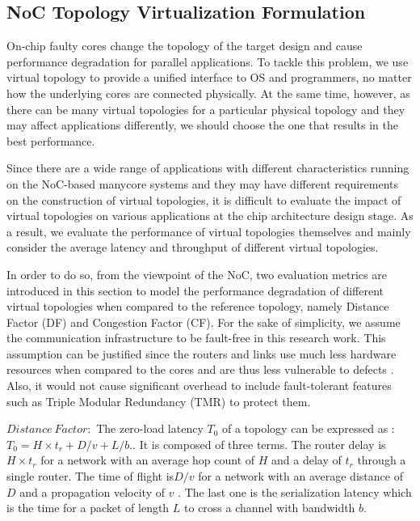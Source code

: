 \subsection{NoC Topology Virtualization Formulation}
On-chip faulty cores change the topology of the target design and cause performance degradation for parallel applications. To tackle this problem, we use virtual topology to provide a unified interface to OS and programmers, no matter how the underlying cores are connected physically. At the same time, however, as there can be many virtual topologies for a particular physical topology and they may affect applications differently, we should choose the one that results in the best performance.

Since there are a wide range of applications with different characteristics running on the NoC-based manycore systems and they may have different requirements on the construction of virtual topologies, it is difficult to evaluate the impact of virtual topologies on various applications at the chip architecture design stage. As a result, we evaluate the performance of virtual topologies themselves and mainly consider the average latency and throughput of different virtual topologies.

In order to do so, from the viewpoint of the NoC, two evaluation metrics are introduced in this section to model the performance degradation of different virtual topologies when compared to the reference topology, namely Distance Factor (DF) and Congestion Factor (CF). For the sake of simplicity, we assume the communication infrastructure to be fault-free in this research work. This assumption can be justified since the routers and links use much less hardware resources when compared to the cores and are thus less vulnerable to defects \cite{fukushi2005genetic}. Also, it would not cause significant overhead to include fault-tolerant features such as Triple Modular Redundancy (TMR) to protect them.

$Distance\ Factor:$ The zero-load latency $T_{0}$ of a topology can be expressed as \cite{dally2004principles}: $T_{0}=H \times t_{r}+D / v+L / b .$. It is composed of three terms. The router delay is    $H \times t_{r}$ for a network with an average hop count of $H$ and a delay of $t_{r}$  through a single router. The time of flight is$ D / v $ for a network with an average distance of  $D$  and a propagation velocity of  $v$ . The last one is the serialization latency which is the time for a packet of length $L$ to cross a channel with bandwidth $b$.

